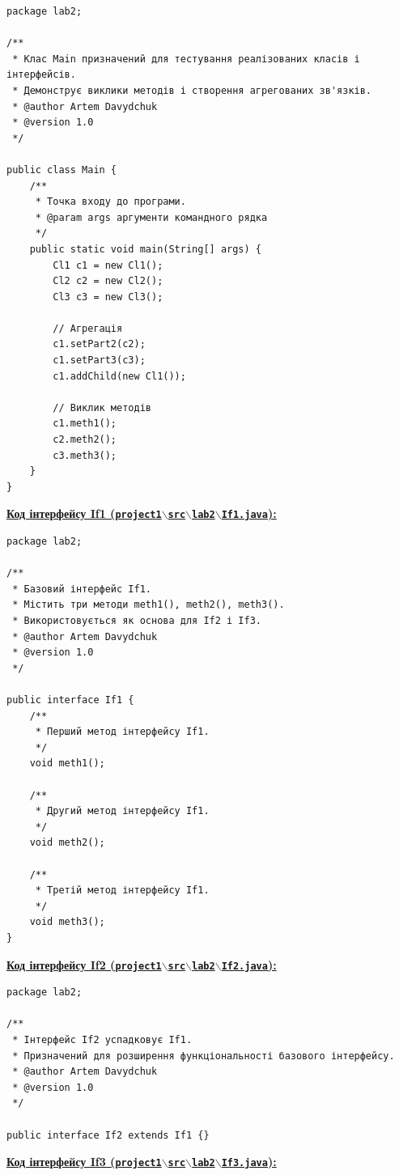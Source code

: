 \documentclass[12pt,a4paper]{article}
\begin{document}
    \begin{verbatim}
package lab2;

/**
 * Клас Main призначений для тестування реалізованих класів і інтерфейсів.
 * Демонструє виклики методів і створення агрегованих зв'язків.
 * @author Artem Davydchuk
 * @version 1.0
 */

public class Main {
    /**
     * Точка входу до програми.
     * @param args аргументи командного рядка
     */
    public static void main(String[] args) {
        Cl1 c1 = new Cl1();
        Cl2 c2 = new Cl2();
        Cl3 c3 = new Cl3();

        // Агрегація
        c1.setPart2(c2);
        c1.setPart3(c3);
        c1.addChild(new Cl1());

        // Виклик методів
        c1.meth1();
        c2.meth2();
        c3.meth3();
    }
}
    \end{verbatim}

    \textbf{\underline{Код інтерфейсу If1 (\texttt{project1$\backslash$src$\backslash$lab2$\backslash$If1.java}):}}

    \begin{verbatim}
package lab2;

/**
 * Базовий інтерфейс If1.
 * Містить три методи meth1(), meth2(), meth3().
 * Використовується як основа для If2 і If3.
 * @author Artem Davydchuk
 * @version 1.0
 */

public interface If1 {
    /**
     * Перший метод інтерфейсу If1.
     */
    void meth1();

    /**
     * Другий метод інтерфейсу If1.
     */
    void meth2();

    /**
     * Третій метод інтерфейсу If1.
     */
    void meth3();
}

    \end{verbatim}

    \textbf{\underline{Код інтерфейсу If2 (\texttt{project1$\backslash$src$\backslash$lab2$\backslash$If2.java}):}}

    \begin{verbatim}
package lab2;

/**
 * Інтерфейс If2 успадковує If1.
 * Призначений для розширення функціональності базового інтерфейсу.
 * @author Artem Davydchuk
 * @version 1.0
 */

public interface If2 extends If1 {}
    \end{verbatim}

    \textbf{\underline{Код інтерфейсу If3 (\texttt{project1$\backslash$src$\backslash$lab2$\backslash$If3.java}):}}
\end{document}

